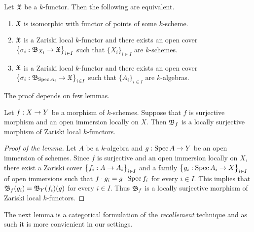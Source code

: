 \begin{theorem}\label{theorem:representabilitybasicresult}
Let ${\mathfrak X}$ be a $k$-functor. Then the following are equivalent.
\begin{enumerate}[label=\emph{\textbf{(\roman*)}}, leftmargin=1.5em]
\item ${\mathfrak X}$ is isomorphic with functor of points of some $k$-scheme.
\item ${\mathfrak X}$ is a Zariski local $k$-functor and there exists an open cover $\big\{\sigma_i:{\mathfrak B}_{X_i}\rightarrow {\mathfrak X}\big\}_{i\in I}$ such that $\{X_i\}_{i\in I}$ are $k$-schemes.
\item ${\mathfrak X}$ is a Zariski local $k$-functor and there exists an open cover $\big\{\sigma_i:{\mathfrak B}_{\mathrm{Spec}\, A_i}\rightarrow {\mathfrak X}\big\}_{i\in I}$ such that $\{A_i\}_{i\in I}$ are $k$-algebras.
\end{enumerate}
\end{theorem}
\noindent
The proof depends on few lemmas.

\begin{lemma}\label{lemma:openimmersionslocallyondomainarezariskilocalkfunctors}
Let $f:X\rightarrow Y$ be a morphism of $k$-schemes. Suppose that $f$ is surjective morphism and an open immersion locally on $X$. Then ${\mathfrak B}_f$ is a locally surjective morphism of Zariski local $k$-functors. 
\end{lemma}
\begin{proof}[Proof of the lemma]
Let $A$ be a $k$-algebra and $g:\mathrm{Spec}\, A\rightarrow Y$ be an open immersion of schemes. Since $f$ is surjective and an open immersion locally on $X$, there exist a Zariski cover $\big\{f_i:A\rightarrow A_i\big\}_{i\in I}$ and a family $\big\{g_i:\mathrm{Spec}\, A_i\rightarrow X\big\}_{i\in I}$ of open immersions such that $f\cdot g_i = g\cdot \mathrm{Spec}\, f_i$ for every $i\in I$. This implies that ${\mathfrak B}_f(g_i) = {\mathfrak B}_Y(f_i)(g)$ for every $i\in I$. Thus ${\mathfrak B}_f$ is a locally surjective morphism of Zariski local $k$-functors.
\end{proof}
\noindent
The next lemma is a categorical formulation of the \textit{recollement} technique {\cite[Chapitre 0, 4.1.7]{EGA1new}} and as such it is more convienient in our settings.

